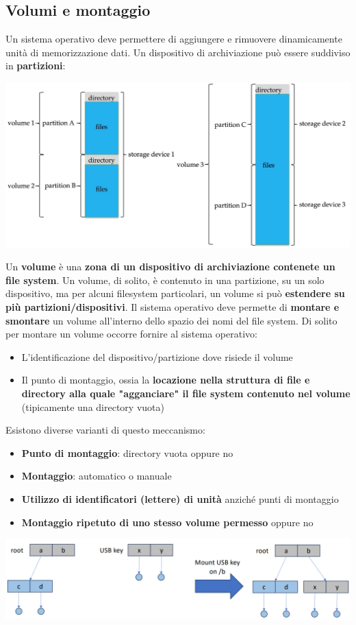 \documentclass[12pt]{article}
\begin{document}
\subsection{Volumi e montaggio}
Un sistema operativo deve permettere di aggiungere e rimuovere dinamicamente unità di memorizzazione dati.
Un dispositivo di archiviazione può essere suddiviso in \textbf{partizioni}:
\begin{center}
    \includegraphics[width = 0.80\linewidth]{Images/30.png}
\end{center}
Un \textbf{volume} è una \textbf{zona di un dispositivo di archiviazione contenete un file system}.
Un volume, di solito, è contenuto in una partizione, su un solo dispositivo,
ma per alcuni filesystem particolari, un volume si può \textbf{estendere su più partizioni/dispositivi}.
Il sistema operativo deve permette di \textbf{montare e smontare} un volume all'interno dello spazio dei nomi del file system.
Di solito per montare un volume occorre fornire al sistema operativo:
\begin{itemize}
    \item L'identificazione del dispositivo/partizione dove risiede il volume
    \item Il punto di montaggio, ossia la \textbf{locazione nella struttura di file e directory alla quale "agganciare" il file system contenuto nel volume} (tipicamente una directory vuota)
\end{itemize}
Esistono diverse varianti di questo meccanismo:
\begin{itemize}
    \item \textbf{Punto di montaggio}: directory vuota oppure no
    \item \textbf{Montaggio}: automatico o manuale
    \item \textbf{Utilizzo di identificatori (lettere) di unità} anziché punti di montaggio
    \item \textbf{Montaggio ripetuto di uno stesso volume permesso} oppure no
\end{itemize}
\begin{center}
    \includegraphics[width = 1\linewidth]{Images/31.png}
\end{center}
\end{document}
